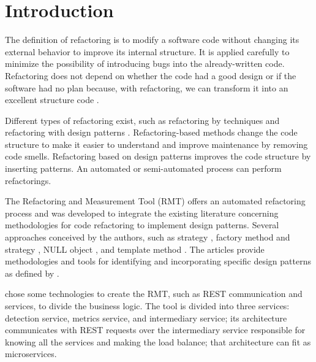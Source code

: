 \chapter{Introduction}%
\label{chpt-intro}

The definition of refactoring is to modify a software code without changing its external behavior to improve its internal structure. It is applied carefully to minimize the possibility of introducing bugs into the already-written code. Refactoring does not depend on whether the code had a good design or if the software had no plan because, with refactoring, we can transform it into an excellent structure code \cite{fowler2018refactoring}.

Different types of refactoring exist, such as refactoring by techniques \cite{fowler2018refactoring} and refactoring with design patterns \cite{kerievsky2005refactoring}. Refactoring-based methods change the code structure to make it easier to understand and improve maintenance by removing code smells. Refactoring based on design patterns improves the code structure by inserting patterns. An automated or semi-automated process can perform refactorings.

The Refactoring and Measurement Tool (RMT) \textcite{beluzzo2018abordagem} offers an automated refactoring process and was developed to integrate the existing literature concerning methodologies for code refactoring to implement design patterns. Several approaches conceived by the authors, such as strategy \cite{CHRISTOPOULOU20121201}, factory method and strategy \cite{Liu2014}, NULL object \cite{GAITANI201533}, and template method \cite{zafeiris2017automated}. The articles provide methodologies and tools for identifying and incorporating specific design patterns as defined by \textcite{Gamma2009}.

\textcite{beluzzo2018abordagem} chose some technologies to create the RMT, such as REST communication and services, to divide the business logic. The tool is divided into three services: detection service, metrics service, and intermediary service; its architecture communicates with REST requests over the intermediary service responsible for knowing all the services and making the load balance; that architecture can fit as microservices.


